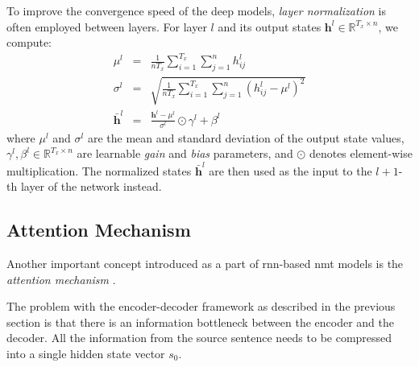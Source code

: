 To improve the convergence speed of the deep models, \emph{layer normalization}
\citep{ba2016layer} is often employed between layers. For layer $l$ and its
output states
$\mathbf{h}^l \in \mathbb{R}^{T_x \times n}$, we compute:
%
\begin{eqnarray}
  \mu^l & = & \frac{1}{nT_x} \sum_{i=1}^{T_x}\sum_{j=1}^n h^l_{ij} \\
  \sigma^l & = & \sqrt{\frac{1}{nT_x} \sum_{i=1}^{T_x}\sum_{j=1}^n (h^l_{ij} - \mu^l)^2} \\
  \bar{\mathbf{h}}^l & = & \frac{\mathbf{h}^l - \mu^l}{\sigma^l} \odot \gamma^l + \beta^l
\end{eqnarray}
%
where $\mu^l$ and $\sigma^l$ are the mean and standard deviation of the output
state values, $\gamma^l, \beta^l \in \mathbb{R}^{T_x \times n}$ are learnable
\emph{gain} and \emph{bias} parameters, and $\odot$ denotes element-wise
multiplication. The normalized states $\bar{\mathbf{h}}^l$ are then used as the
input to the $l+1$-th layer of the network instead.


\subsection{Attention Mechanism}
\label{sec:attention}

Another important concept introduced as a part of \gls{rnn}-based \gls{nmt}
models is the \emph{attention mechanism}
\citep{bahdanau2014neural,luong2015effective}.

The problem with the encoder-decoder framework as described in the previous
section is that there is an information bottleneck between the encoder and the
decoder. All the information from the source sentence needs to be compressed
into a single hidden state vector $s_0$.

